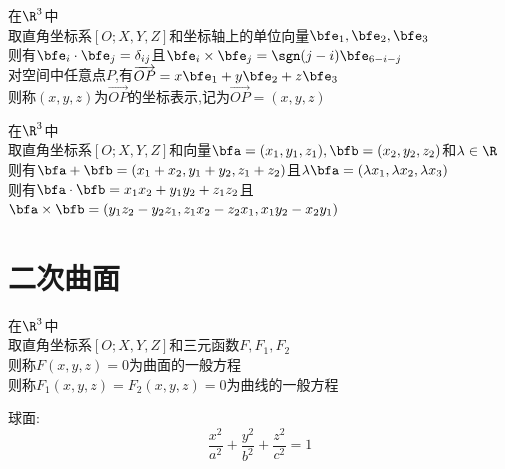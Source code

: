 \begin{dingyi}
在$\R^3$中\\
取直角坐标系$[O;X,Y,Z]$和坐标轴上的单位向量$\bfe_1,\bfe_2,\bfe_3$\\
则有$\bfe_i\cdot\bfe_j=\delta_{ij}$且$\bfe_i\times\bfe_j=\sgn(j-i)\bfe_{6-i-j}$\\
对空间中任意点$P$,有$\overrightarrow{OP}=x\bfe_1+y\bfe_2+z\bfe_3$\\
则称$(x,y,z)$为$\overrightarrow{OP}$的坐标表示,记为$\overrightarrow{OP}=(x,y,z)$
\end{dingyi}

\begin{dingli}
在$\R^3$中\\
取直角坐标系$[O;X,Y,Z]$和向量$\bfa=(x_1,y_1,z_1),\bfb=(x_2,y_2,z_2)$和$\lambda\in\R$\\
则有$\bfa+\bfb=(x_1+x_2,y_1+y_2,z_1+z_2)$且$\lambda\bfa=(\lambda x_1,\lambda x_2,\lambda x_3)$\\
则有$\bfa\cdot\bfb=x_1x_2+y_1y_2+z_1z_2$且$\bfa\times\bfb=(y_1z_2-y_2z_1,z_1x_2-z_2x_1,x_1y_2-x_2y_1)$
\end{dingli}

\chapter{二次曲面}

\begin{dingyi}
在$\R^3$中\\
取直角坐标系$[O;X,Y,Z]$和三元函数$F,F_1,F_2$\\
则称$F(x,y,z)=0$为曲面的一般方程\\
则称$F_1(x,y,z)=F_2(x,y,z)=0$为曲线的一般方程
\end{dingyi}

球面:
\[\frac{x^2}{a^2}+\frac{y^2}{b^2}+\frac{z^2}{c^2}=1\]

